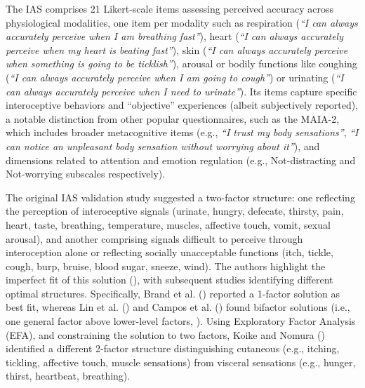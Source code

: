 \documentclass[
  jou,
  floatsintext,
  longtable,
  nolmodern,
  notxfonts,
  notimes,
  colorlinks=true,linkcolor=blue,citecolor=blue,urlcolor=blue]{apa7}
\begin{document}
The IAS comprises 21 Likert-scale items assessing perceived accuracy
across physiological modalities, one item per modality such as
respiration (\emph{``I can always accurately perceive when I am
breathing fast''}), heart (\emph{``I can always accurately perceive when
my heart is beating fast''}), skin (\emph{``I can always accurately
perceive when something is going to be ticklish''}), arousal or bodily
functions like coughing (\emph{``I can always accurately perceive when I
am going to cough''}) or urinating (\emph{``I can always accurately
perceive when I need to urinate''}). Its items capture specific
interoceptive behaviors and ``objective'' experiences (albeit
subjectively reported), a notable distinction from other popular
questionnaires, such as the MAIA-2, which includes broader metacognitive
items (e.g., \emph{``I trust my body sensations''}, \emph{``I can notice
an unpleasant body sensation without worrying about it''}), and
dimensions related to attention and emotion regulation (e.g.,
Not-distracting and Not-worrying subscales respectively).

The original IAS validation study suggested a two-factor structure: one
reflecting the perception of interoceptive signals (urinate, hungry,
defecate, thirsty, pain, heart, taste, breathing, temperature, muscles,
affective touch, vomit, sexual arousal), and another comprising signals
difficult to perceive through interoception alone or reflecting socially
unacceptable functions (itch, tickle, cough, burp, bruise, blood sugar,
sneeze, wind). The authors highlight the imperfect fit of this solution
(), with
subsequent studies identifying different optimal structures.
Specifically, Brand et al. () reported a
1-factor solution as best fit, whereas Lin et al.
() and Campos et al.
() found bifactor solutions (i.e., one
general factor above lower-level factors,
). Using
Exploratory Factor Analysis (EFA), and constraining the solution to two
factors, Koike and Nomura () identified a
different 2-factor structure distinguishing cutaneous (e.g., itching,
tickling, affective touch, muscle sensations) from visceral sensations
(e.g., hunger, thirst, heartbeat, breathing).
\end{document}
